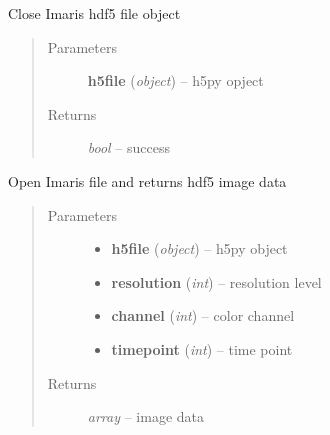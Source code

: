 \documentclass[letterpaper,10pt,english]{sphinxmanual}
\begin{document}

\begin{fulllineitems}
\label{api/ClearMap.IO:ClearMap.IO.Imaris.closeFile}
Close Imaris hdf5 file object
\begin{quote}\begin{description}
\item[{Parameters}] \leavevmode
\textbf{h5file} (\emph{object}) --
h5py opject

\item[{Returns}] \leavevmode
\emph{bool} --
success

\end{description}\end{quote}

\end{fulllineitems}


\begin{fulllineitems}
\label{api/ClearMap.IO:ClearMap.IO.Imaris.readDataSet}
Open Imaris file and returns hdf5 image data
\begin{quote}\begin{description}
\item[{Parameters}] \leavevmode\begin{itemize}
\item {} 
\textbf{h5file} (\emph{object}) --
h5py object

\item {} 
\textbf{resolution} (\emph{int}) --
resolution level

\item {} 
\textbf{channel} (\emph{int}) --
color channel

\item {} 
\textbf{timepoint} (\emph{int}) --
time point

\end{itemize}

\item[{Returns}] \leavevmode
\emph{array} --
image data

\end{description}\end{quote}

\end{fulllineitems}
\end{document}
